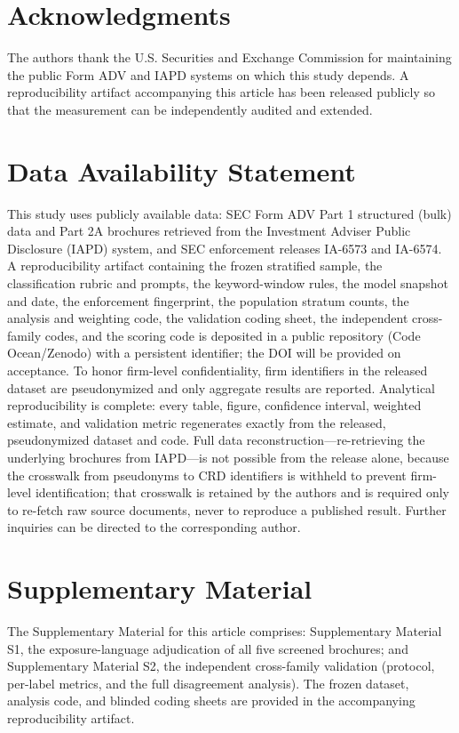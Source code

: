 \documentclass[utf8]{FrontiersinHarvard} %
\begin{document}
\section*{Acknowledgments}
The authors thank the U.S. Securities and Exchange Commission for maintaining the public Form ADV and IAPD systems on which this study depends. A reproducibility artifact accompanying this article has been released publicly so that the measurement can be independently audited and extended.

\section*{Data Availability Statement}
This study uses publicly available data: SEC Form ADV Part 1 structured (bulk) data and Part 2A brochures retrieved from the Investment Adviser Public Disclosure (IAPD) system, and SEC enforcement releases IA-6573 and IA-6574. A reproducibility artifact containing the frozen stratified sample, the classification rubric and prompts, the keyword-window rules, the model snapshot and date, the enforcement fingerprint, the population stratum counts, the analysis and weighting code, the validation coding sheet, the independent cross-family codes, and the scoring code is deposited in a public repository (Code Ocean/Zenodo) with a persistent identifier; the DOI will be provided on acceptance. To honor firm-level confidentiality, firm identifiers in the released dataset are pseudonymized and only aggregate results are reported. Analytical reproducibility is complete: every table, figure, confidence interval, weighted estimate, and validation metric regenerates exactly from the released, pseudonymized dataset and code. Full data reconstruction---re-retrieving the underlying brochures from IAPD---is not possible from the release alone, because the crosswalk from pseudonyms to CRD identifiers is withheld to prevent firm-level identification; that crosswalk is retained by the authors and is required only to re-fetch raw source documents, never to reproduce a published result. Further inquiries can be directed to the corresponding author.




\section*{Supplementary Material}
The Supplementary Material for this article comprises: Supplementary Material S1, the exposure-language adjudication of all five screened brochures; and Supplementary Material S2, the independent cross-family validation (protocol, per-label metrics, and the full disagreement analysis). The frozen dataset, analysis code, and blinded coding sheets are provided in the accompanying reproducibility artifact.
\end{document}
